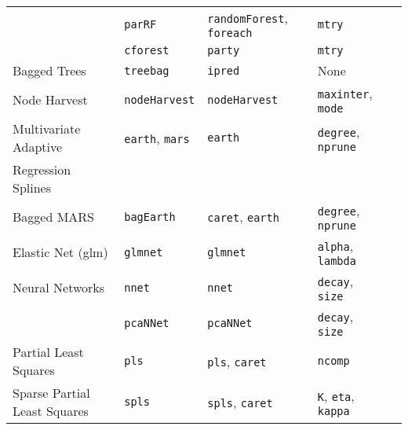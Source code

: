 \documentclass[12pt]{article}
\begin{document}
\begin{longtable}{lllll}
        & 
         \texttt{parRF} & 
            \texttt{randomForest}, \texttt{foreach}       & 
            \texttt{mtry} \\              
            
       & 
         \texttt{cforest} & 
            \texttt{party}       & 
            \texttt{mtry} \\     
                        
      Bagged Trees &
         \texttt{treebag} & 
            \texttt{ipred}       & 
            None \\                         
   
      Node Harvest &
         \texttt{nodeHarvest} & 
            \texttt{nodeHarvest}       & 
            \texttt{maxinter}, \texttt{mode}  \\                  
            
      Multivariate Adaptive  &
         \texttt{earth}, \texttt{mars} & 
            \texttt{earth}       & 
            \texttt{degree}, \texttt{nprune} \\            
      \:\: Regression Splines & & &\\
            
      Bagged MARS &
         \texttt{bagEarth} & 
            \texttt{caret},  \texttt{earth}      & 
            \texttt{degree}, \texttt{nprune} \\ 
            
      Elastic Net (glm) &               
         \texttt{glmnet} & 
            \texttt{glmnet}       &       
            \texttt{alpha}, \texttt{lambda} \\ 
            
      Neural Networks &               
         \texttt{nnet} & 
            \texttt{nnet}       &       
            \texttt{decay}, \texttt{size} \\      

       &               
         \texttt{pcaNNet} & 
            \texttt{pcaNNet}       &       
            \texttt{decay}, \texttt{size} \\              
            
      Partial Least Squares &
         \texttt{pls} & 
            \texttt{pls}, \texttt{caret}       & 
            \texttt{ncomp} \\      

      Sparse Partial Least Squares &
         \texttt{spls} & 
            \texttt{spls}, \texttt{caret}      & 
            \texttt{K}, \texttt{eta}, \texttt{kappa} \\   
        

\end{longtable}
\end{document}
